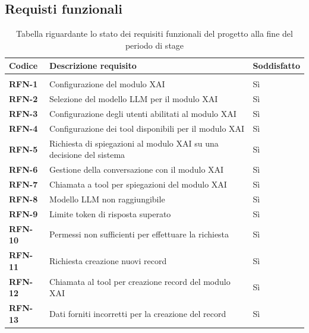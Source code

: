\subsection{Requisti funzionali}
\keepXColumns
{}
    \begin{longtable}{|l|p{}|l|}
        \hline
        \rowcolor{gold}
        \textbf{Codice} & \textbf{Descrizione requisito} & \textbf{Soddisfatto} \\
        \hline
        \endhead

        \hline
        \rowcolor{white}
        \caption{Tabella riguardante lo stato dei requisiti funzionali del progetto alla fine del periodo di stage} \label{tab:requisiti_stato_funzionali} \\
        \endlastfoot 

        \textbf{RFN-1} & Configurazione del modulo XAI & Sì \\
        \hline
        \textbf{RFN-2} & Selezione del modello LLM per il modulo XAI & Sì \\
        \hline
        \textbf{RFN-3} & Configurazione degli utenti abilitati al modulo XAI & Sì \\
        \hline
        \textbf{RFN-4} & Configurazione dei tool disponibili per il modulo XAI & Sì \\
        \hline
        \textbf{RFN-5} & Richiesta di spiegazioni al modulo XAI su una decisione del sistema & Sì \\
        \hline
        \textbf{RFN-6} & Gestione della conversazione con il modulo XAI & Sì \\
        \hline
        \textbf{RFN-7} & Chiamata a tool per spiegazioni del modulo XAI & Sì \\
        \hline
        \textbf{RFN-8} & Modello LLM non raggiungibile & Sì \\
        \hline
        \textbf{RFN-9} & Limite token di risposta superato & Sì \\
        \hline
        \textbf{RFN-10} & Permessi non sufficienti per effettuare la richiesta & Sì \\
        \hline
        \textbf{RFN-11} & Richiesta creazione nuovi record & Sì \\
        \hline
        \textbf{RFN-12} & Chiamata al tool per creazione record del modulo XAI & Sì \\
        \hline
        \textbf{RFN-13} & Dati forniti incorretti per la creazione del record & Sì \\
        \hline

\end{longtable}
